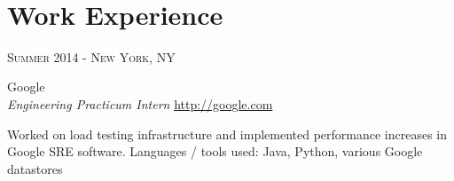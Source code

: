 \documentclass[10pt]{article} %
\begin{document}
\color{text1} %


\par{\\ %
	

\begin{minipage}[t]{0.5\textwidth} %
\vspace{0pt} %



\section{Work Experience} 


{\raggedleft\textsc{Summer 2014 - New York, NY}\par}

{\raggedright\large Google \\
\textit{Engineering Practicum Intern}  \hfill {\small \href{http://google.com}{http://google.com}}\\ [5pt]}

\normalsize{Worked on load testing infrastructure and implemented performance increases
    in Google SRE software. Languages / tools used: Java, Python, various Google datastores}\\



\end{minipage}}
\end{document}
